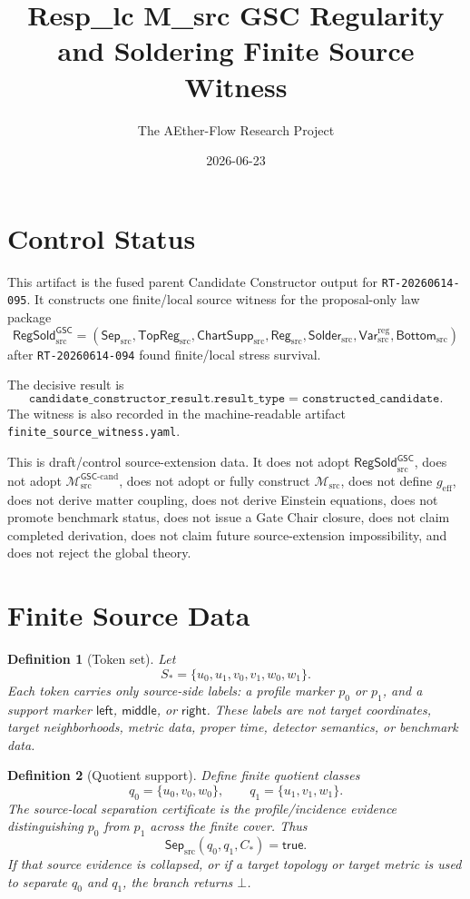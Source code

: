 \documentclass[11pt]{article}
\title{Resp\_lc M\_src GSC Regularity and Soldering Finite Source Witness}
\author{The AEther-Flow Research Project}
\date{2026-06-23}
\newcommand{\Msrc}{\mathcal{M}_{\mathrm{src}}}
\newcommand{\Mgsccand}{\mathcal{M}_{\mathrm{src}}^{\mathsf{GSC}\text{-}\mathrm{cand}}}
\newcommand{\geff}{g_{\mathrm{eff}}}
\newcommand{\RegSold}{\mathsf{RegSold}_{\mathrm{src}}^{\mathsf{GSC}}}
\newcommand{\SepSrc}{\mathsf{Sep}_{\mathrm{src}}}
\newcommand{\TopRegSrc}{\mathsf{TopReg}_{\mathrm{src}}}
\newcommand{\ChartSuppSrc}{\mathsf{ChartSupp}_{\mathrm{src}}}
\newcommand{\RegSrc}{\mathsf{Reg}_{\mathrm{src}}}
\newcommand{\SolderSrc}{\mathsf{Solder}_{\mathrm{src}}}
\newcommand{\VarRegSrc}{\mathsf{Var}^{\mathrm{reg}}_{\mathrm{src}}}
\newcommand{\BottomSrc}{\mathsf{Bottom}_{\mathrm{src}}}
\newcommand{\Bot}{\bot}
\newtheorem{definition}{Definition}
\begin{document}
\maketitle

\section*{Control Status}

This artifact is the fused parent Candidate Constructor output for
\texttt{RT-20260614-095}. It constructs one finite/local source witness for
the proposal-only law package
\[
  \RegSold =
  (\SepSrc,\TopRegSrc,\ChartSuppSrc,\RegSrc,\SolderSrc,\VarRegSrc,\BottomSrc)
\]
after \texttt{RT-20260614-094} found finite/local stress survival.

The decisive result is
\[
  \texttt{candidate\_constructor\_result.result\_type}
  =
  \texttt{constructed\_candidate}.
\]
The witness is also recorded in the machine-readable artifact
\texttt{finite\_source\_witness.yaml}.

This is draft/control source-extension data. It does not adopt \(\RegSold\),
does not adopt \(\Mgsccand\), does not adopt or fully construct \(\Msrc\),
does not define \(\geff\), does not derive matter coupling, does not derive
Einstein equations, does not promote benchmark status, does not issue a Gate
Chair closure, does not claim completed derivation, does not claim future
source-extension impossibility, and does not reject the global theory.

\section{Finite Source Data}

\begin{definition}[Token set]
Let
\[
S_*=\{u_0,u_1,v_0,v_1,w_0,w_1\}.
\]
Each token carries only source-side labels: a profile marker \(p_0\) or
\(p_1\), and a support marker \(\mathsf{left}\), \(\mathsf{middle}\), or
\(\mathsf{right}\). These labels are not target coordinates, target
neighborhoods, metric data, proper time, detector semantics, or benchmark
data.
\end{definition}

\begin{definition}[Quotient support]
Define finite quotient classes
\[
q_0=\{u_0,v_0,w_0\},\qquad
q_1=\{u_1,v_1,w_1\}.
\]
The source-local separation certificate is the profile/incidence evidence
distinguishing \(p_0\) from \(p_1\) across the finite cover. Thus
\[
\SepSrc(q_0,q_1,C_*)=\mathsf{true}.
\]
If that source evidence is collapsed, or if a target topology or target
metric is used to separate \(q_0\) and \(q_1\), the branch returns \(\Bot\).
\end{definition}
\end{document}
